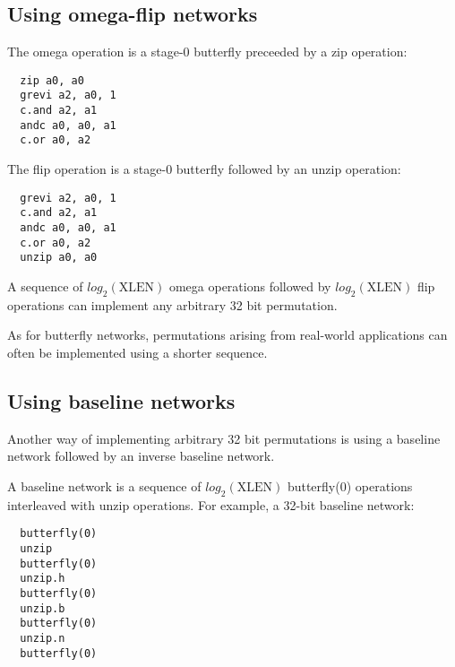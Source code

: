 
\subsection{Using omega-flip networks}

The omega operation is a stage-0 butterfly preceeded by a zip operation:

\begin{verbatim}
  zip a0, a0
  grevi a2, a0, 1
  c.and a2, a1
  andc a0, a0, a1
  c.or a0, a2
\end{verbatim}

The flip operation is a stage-0 butterfly followed by an unzip operation:

\begin{verbatim}
  grevi a2, a0, 1
  c.and a2, a1
  andc a0, a0, a1
  c.or a0, a2
  unzip a0, a0
\end{verbatim}

A sequence of $log_2(\textrm{XLEN})$ omega operations followed by
$log_2(\textrm{XLEN})$ flip operations can implement any arbitrary 32 bit
permutation.

As for butterfly networks, permutations arising from real-world applications
can often be implemented using a shorter sequence.


\subsection{Using baseline networks}

Another way of implementing arbitrary 32 bit permutations is using a
baseline network followed by an inverse baseline network.

A baseline network is a sequence of $log_2(\textrm{XLEN})$ butterfly(0)
operations interleaved with unzip operations. For example, a 32-bit
baseline network:

\begin{verbatim}
  butterfly(0)
  unzip
  butterfly(0)
  unzip.h
  butterfly(0)
  unzip.b
  butterfly(0)
  unzip.n
  butterfly(0)
\end{verbatim}

